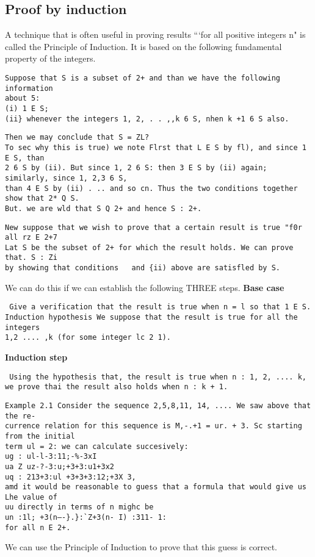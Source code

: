\documentclass[]{article}
\begin{document}
\subsection*{Proof by induction}


A technique that is often useful in proving results “‘for all positive integers n" is
called the Principle of Induction. It is based on the following fundamental
property of the integers.

\begin{verbatim}
Suppose that S is a subset of 2+ and than we have the following information
about 5:
(i) 1 E S;
(ii} whenever the integers 1, 2, . . ,,k 6 S, nhen k +1 6 S also.

\end{verbatim}
\begin{verbatim}
Then we may conclude that S = ZL?
To sec why this is true) we note Flrst that L E S by fl), and since 1 E S, than
2 6 S by (ii). But since 1, 2 6 S: then 3 E S by (ii) again; similarly, since 1, 2,3 6 S,
than 4 E S by (ii) . .. and so cn. Thus the two conditions together show that 2* Q S.
But. we are wld that S Q 2+ and hence S : 2+.
\end{verbatim}
\begin{verbatim}
New suppose that we wish to prove that a certain result is true "f0r all rz E 2+7
Lat S be the subset of 2+ for which the result holds. We can prove that. S : Zi
by showing that conditions   and {ii) above are satisfled by S. 
\end{verbatim}
We can do this if
we can establish the following THREE steps.
\textbf{Base case}
\begin{verbatim}
 Give a verification that the result is true when n = l so that 1 E S.
Induction hypothesis We suppose that the result is true for all the integers
1,2 .... ,k (for some integer lc 2 1).
\end{verbatim}
\textbf{Induction step}
\begin{verbatim}
 Using the hypothesis that, the result is true when n : 1, 2, .... k,
we prove thai the result also holds when n : k + 1.
\end{verbatim}
\begin{verbatim}
Example 2.1 Consider the sequence 2,5,8,11, 14, .... We saw above that the re-
currence relation for this sequence is M,-.+1 = ur. + 3. Sc starting from the initial
term ul = 2: we can calculate succesively:
ug : ul-l-3:11;-%-3xI
ua Z uz-?-3:u;+3+3:u1+3x2
uq : 213+3:ul +3+3+3:12;+3X 3,
amd it would be reasonable to guess that a formula that would give us Lhe value of
uu directly in terms of n mighc be
un :1l; +3(n—-}.}:`Z+3(n- I) :311- 1:
for all n E 2+. 
\end{verbatim}
We can use the Principle of Induction to prove that this guess is
correct.
\end{document}
